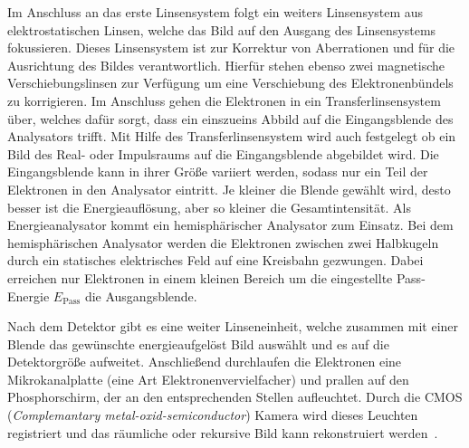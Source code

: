         Im Anschluss an das erste Linsensystem folgt ein weiters Linsensystem aus elektrostatischen Linsen, welche das Bild auf den Ausgang des Linsensystems fokussieren.
        Dieses Linsensystem ist zur Korrektur von Aberrationen und für die Ausrichtung des Bildes verantwortlich.
        Hierfür stehen ebenso zwei magnetische Verschiebungslinsen zur Verfügung um eine Verschiebung des Elektronenbündels zu korrigieren.
        Im Anschluss gehen die Elektronen in ein Transferlinsensystem über, welches dafür sorgt, dass ein einszueins Abbild auf die Eingangsblende des Analysators trifft.
        Mit Hilfe des Transferlinsensystem wird auch festgelegt ob ein Bild des Real- oder Impulsraums auf die Eingangsblende abgebildet wird.
        Die Eingangsblende kann in ihrer Größe variiert werden, sodass nur ein Teil der Elektronen in den Analysator eintritt.
        Je kleiner die Blende gewählt wird, desto besser ist die Energieauflösung, aber so kleiner die Gesamtintensität.
        Als Energieanalysator kommt ein hemisphärischer Analysator zum Einsatz.
        Bei dem hemisphärischen Analysator werden die Elektronen zwischen zwei Halbkugeln durch ein statisches elektrisches Feld auf eine Kreisbahn gezwungen.
        Dabei erreichen nur Elektronen in einem kleinen Bereich um die eingestellte Pass-Energie $E_\text{Pass}$ die Ausgangsblende.
        
        Nach dem Detektor gibt es eine weiter Linseneinheit, welche zusammen mit einer Blende das gewünschte energieaufgelöst Bild auswählt und es auf die Detektorgröße aufweitet.
        Anschließend durchlaufen die Elektronen eine Mikrokanalplatte (eine Art Elektronenvervielfacher) und prallen auf den Phosphorschirm, der an den entsprechenden Stellen aufleuchtet.
        Durch die CMOS (\textit{Complemantary metal-oxid-semiconductor}) Kamera wird dieses Leuchten registriert und das räumliche oder rekursive Bild kann rekonstruiert werden~\cite{SPECS-MM}.
        
